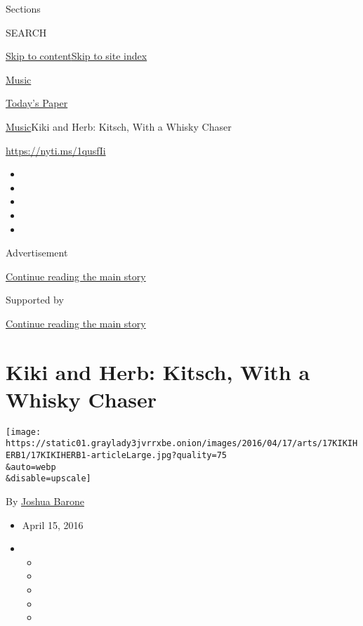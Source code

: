 Sections

SEARCH

\protect\hyperlink{site-content}{Skip to
content}\protect\hyperlink{site-index}{Skip to site index}

\href{https://www.nytimes3xbfgragh.onion/section/arts/music}{Music}

\href{https://myaccount.nytimes3xbfgragh.onion/auth/login?response_type=cookie\&client_id=vi}{}

\href{https://www.nytimes3xbfgragh.onion/section/todayspaper}{Today's
Paper}

\href{/section/arts/music}{Music}\textbar{}Kiki and Herb: Kitsch, With a
Whisky Chaser

\url{https://nyti.ms/1qusfIi}

\begin{itemize}
\item
\item
\item
\item
\item
\end{itemize}

Advertisement

\protect\hyperlink{after-top}{Continue reading the main story}

Supported by

\protect\hyperlink{after-sponsor}{Continue reading the main story}

\hypertarget{kiki-and-herb-kitsch-with-a-whisky-chaser}{%
\section{Kiki and Herb: Kitsch, With a Whisky
Chaser}\label{kiki-and-herb-kitsch-with-a-whisky-chaser}}

\texttt{[image: https://static01.graylady3jvrrxbe.onion/images/2016/04/17/arts/17KIKIHERB1/17KIKIHERB1-articleLarge.jpg?quality=75\\\&auto=webp\\\&disable=upscale]}

By \href{http://www.nytimes3xbfgragh.onion/by/joshua-barone}{Joshua
Barone}

\begin{itemize}
\item
  April 15, 2016
\item
  \begin{itemize}
  \item
  \item
  \item
  \item
  \item
  \end{itemize}
\end{itemize}

